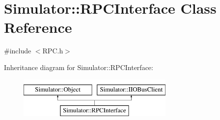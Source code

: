 \hypertarget{class_simulator_1_1_r_p_c_interface}{\section{Simulator\+:\+:R\+P\+C\+Interface Class Reference}
\label{class_simulator_1_1_r_p_c_interface}
}


{\ttfamily \#include $<$R\+P\+C.\+h$>$}

Inheritance diagram for Simulator\+:\+:R\+P\+C\+Interface\+:\begin{figure}[H]
\begin{center}
\leavevmode
\includegraphics[height=2.000000cm]{class_simulator_1_1_r_p_c_interface}
\end{center}
\end{figure}
